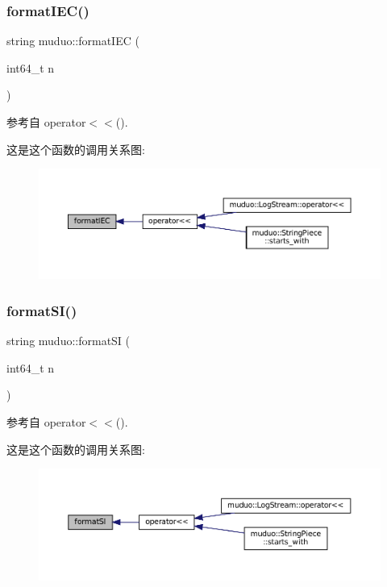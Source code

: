\subsubsection{\texorpdfstring{format\+I\+E\+C()}{formatIEC()}}
{\footnotesize\ttfamily string muduo\+::format\+I\+EC (\begin{DoxyParamCaption}\item[{int64\+\_\+t}]{n }\end{DoxyParamCaption})}



参考自 operator$<$$<$().

这是这个函数的调用关系图\+:
\nopagebreak
\begin{figure}[H]
\begin{center}
\leavevmode
\includegraphics[width=350pt]{namespacemuduo_a2ad8a8650556c05bae4c4f449ac6d106_icgraph}
\end{center}
\end{figure}
\mbox{\label{namespacemuduo_a2530c171cac6dda7399a9eb5805e01fa}} 
\subsubsection{\texorpdfstring{format\+S\+I()}{formatSI()}}
{\footnotesize\ttfamily string muduo\+::format\+SI (\begin{DoxyParamCaption}\item[{int64\+\_\+t}]{n }\end{DoxyParamCaption})}



参考自 operator$<$$<$().

这是这个函数的调用关系图\+:
\nopagebreak
\begin{figure}[H]
\begin{center}
\leavevmode
\includegraphics[width=350pt]{namespacemuduo_a2530c171cac6dda7399a9eb5805e01fa_icgraph}
\end{center}
\end{figure}
\mbox{\label{namespacemuduo_a98789775449e36c3c0c26004e19ef6bc}} 
